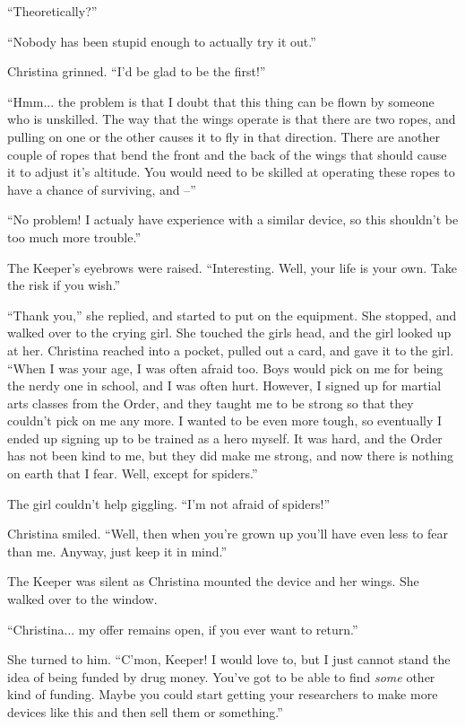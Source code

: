 \documentclass[showtrims,b6paper,draft,10pt]{memoir}
\begin{document}
``Theoretically?''

``Nobody has been stupid enough to actually try it out.''

Christina grinned.  ``I'd be glad to be the first!''

``Hmm... the problem is that I doubt that this thing can be flown by someone who is unskilled.  The way that the wings operate is that there are two ropes, and pulling on one or the other causes it to fly in that direction.  There are another couple of ropes that bend the front and the back of the wings that should cause it to adjust it's altitude.  You would need to be skilled at operating these ropes to have a chance of surviving, and --''

``No problem!  I actualy have experience with a similar device, so this shouldn't be too much more trouble.''

The Keeper's eyebrows were raised.  ``Interesting.  Well, your life is your own.  Take the risk if you wish.''

``Thank you,'' she replied, and started to put on the equipment.  She stopped, and walked over to the crying girl.  She touched the girls head, and the girl looked up at her.  Christina reached into a pocket, pulled out a card, and gave it to the girl.  ``When I was your age, I was often afraid too.  Boys would pick on me for being the nerdy one in school, and I was often hurt.  However, I signed up for martial arts classes from the Order, and they taught me to be strong so that they couldn't pick on me any more.  I wanted to be even more tough, so eventually I ended up signing up to be trained as a hero myself.  It was hard, and the Order has not been kind to me, but they did make me strong, and now there is nothing on earth that I fear.  Well, except for spiders.''

The girl couldn't help giggling.  ``I'm not afraid of spiders!''

Christina smiled.  ``Well, then when you're grown up you'll have even less to fear than me.  Anyway, just keep it in mind.''

The Keeper was silent as Christina mounted the device and her wings.  She walked over to the window.

``Christina... my offer remains open, if you ever want to return.''

She turned to him.  ``C'mon, Keeper!  I would love to, but I just cannot stand the idea of being funded by drug money.  You've got to be able to find \emph{some} other kind of funding.  Maybe you could start getting your researchers to make more devices like this and then sell them or something.''
\end{document}
